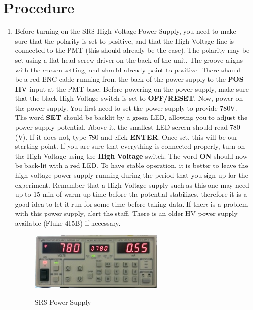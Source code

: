 \documentclass{../lab}
\begin{document}
\section{Procedure}

\begin{enumerate}
    \item Before turning on the SRS High Voltage Power Supply, you need to make sure that the polarity is set to positive, and that the High Voltage line is connected to the PMT (this should already be the case). The polarity may be set using a flat-head screw-driver on the back of the unit. The groove aligns with the chosen setting, and should already point to positive. There should be a red BNC cable running from the back of the power supply to the \textbf{POS HV} input at the PMT base. Before powering on the power supply, make sure that the black High Voltage switch is set to \textbf{OFF/RESET}. Now, power on the power supply. You first need to set the power supply to provide 780V. The word \textbf{SET} should be backlit by a green LED, allowing you to adjust the power supply potential. Above it, the smallest LED screen should read 780 (V). If it does not, type 780 and click \textbf{ENTER}. Once set, this will be our starting point. If you are sure that everything is connected properly, turn on the High Voltage using the \textbf{High Voltage} switch. The word \textbf{ON} should now be back-lit with a red LED. To have stable operation, it is better to leave the high-voltage power supply running during the period that you sign up for the experiment. Remember that a High Voltage supply such as this one may need up to 15 min of warm-up time before the potential stabilizes, therefore it is a good idea to let it run for some time before taking data. If there is a problem with this power supply, alert the staff. There is an older HV power supply available (Fluke 415B) if necessary.
    
    \begin{figure}[h]
        \centering
        \href{http://experimentationlab.berkeley.edu/sites/default/files/images/250px-HV-SRS-PSU.jpg}{\includegraphics[width=0.6\linewidth]{images/250px-HV-SRS-PSU.jpg}}
        \caption{SRS Power Supply}
        \label{fig:250px-HV-SRS-PSU}
    \end{figure}


\end{enumerate}
\end{document}
